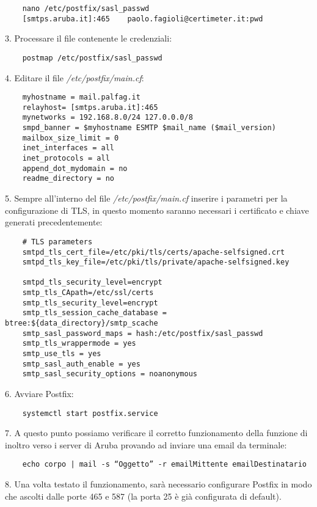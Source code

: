 \begin{verbatim}
    nano /etc/postfix/sasl_passwd
    [smtps.aruba.it]:465    paolo.fagioli@certimeter.it:pwd
\end{verbatim}
3. Processare il file contenente le credenziali:

\begin{verbatim}
    postmap /etc/postfix/sasl_passwd
\end{verbatim}
4. Editare il file \textit{/etc/postfix/main.cf}:

\begin{verbatim}
    myhostname = mail.palfag.it
    relayhost= [smtps.aruba.it]:465
    mynetworks = 192.168.8.0/24 127.0.0.0/8
    smpd_banner = $myhostname ESMTP $mail_name ($mail_version)
    mailbox_size_limit = 0
    inet_interfaces = all
    inet_protocols = all
    append_dot_mydomain = no
    readme_directory = no
\end{verbatim}
5. Sempre all'interno del file \textit{/etc/postfix/main.cf} inserire i parametri per la configurazione di TLS,
in questo momento saranno necessari i certificato e chiave generati precedentemente:

\begin{verbatim}
    # TLS parameters
    smtpd_tls_cert_file=/etc/pki/tls/certs/apache-selfsigned.crt
    smtpd_tls_key_file=/etc/pki/tls/private/apache-selfsigned.key

    smtpd_tls_security_level=encrypt
    smtp_tls_CApath=/etc/ssl/certs
    smtp_tls_security_level=encrypt
    smtp_tls_session_cache_database = btree:${data_directory}/smtp_scache
    smtp_sasl_password_maps = hash:/etc/postfix/sasl_passwd
    smtp_tls_wrappermode = yes
    smtp_use_tls = yes
    smtp_sasl_auth_enable = yes
    smtp_sasl_security_options = noanonymous
\end{verbatim}
6. Avviare Postfix:
\begin{verbatim}
    systemctl start postfix.service
\end{verbatim}
7. A questo punto possiamo verificare il corretto funzionamento della funzione di inoltro verso i server di Aruba 
provando ad inviare una email da terminale:

\begin{verbatim}
    echo corpo | mail -s “Oggetto” -r emailMittente emailDestinatario 
\end{verbatim}
8. Una volta testato il funzionamento, sarà necessario configurare Postfix in modo che ascolti dalle porte 465 e 587 
(la porta 25 è già configurata di default).

